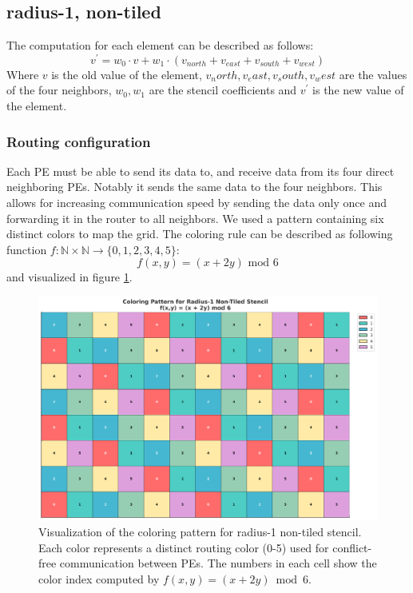 \documentclass{article}
\newcommand{\m}{\text{ mod }}
\begin{document}
\subsection{radius-1, non-tiled}
The computation for each element can be described as follows:
\begin{equation}
    \label{eq:stencil_computation}
    v^{'} = w_0 \cdot v + w_1 \cdot (v_{north} + v_{east} + v_{south} + v_{west})
\end{equation}
Where $v$ is the old value of the element, $v_north, v_east, v_south, v_west$ are the values of the four neighbors, $w_0, w_1$ are the stencil coefficients and $v^'$ is the new value of the element.

\subsubsection{Routing configuration}
Each PE must be able to send its data to, and receive data from its four direct neighboring PEs. Notably it sends the same data to the four neighbors. This allows for increasing communication speed by sending the data only once and forwarding it in the router to all neighbors. We used a pattern containing six distinct colors to map the grid.
The coloring rule can be described as following function $f:\mathbb{N}\times\mathbb{N}\to\{0,1,2,3,4,5\}$:
\begin{equation}
    \label{eq:coloring_function}
    f(x,y) = (x + 2y) \m 6
\end{equation}
and visualized in figure \ref{fig:r1_stencil_coloring}.
\begin{figure}
    \centering
    \includegraphics[width=0.5\linewidth]{plots/r1-stencil-coloring.png}
    \caption{Visualization of the coloring pattern for radius-1 non-tiled stencil. Each color represents a distinct routing color (0-5) used for conflict-free communication between PEs. The numbers in each cell show the color index computed by $f(x,y) = (x + 2y) \bmod 6$.}
    \label{fig:r1_stencil_coloring}
\end{figure}
\end{document}
